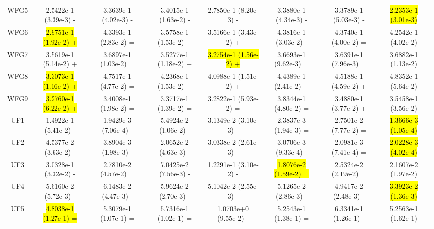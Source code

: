 \documentclass[journal]{IEEEtran}
\begin{document}
\begin{table}[tbp]
{\begin{tabular}{cccccccc}
            WFG5    & 2.5422e-1 (3.39e-3) -      & 3.3639e-1 (4.02e-3) -      & 3.4015e-1 (1.63e-2) -      & 2.7850e-1 (8.20e-3) -      & 3.3880e-1 (4.34e-3) -      & 3.3789e-1 (5.03e-3) -      & \hl{2.2353e-1 (3.01e-3)} \\
            WFG6    & \hl{2.9751e-1 (1.92e-2) +} & 4.3393e-1 (2.83e-2) =      & 3.5758e-1 (1.53e-2) +      & 3.5166e-1 (3.43e-2) +      & 4.3816e-1 (3.03e-2) -      & 4.3740e-1 (4.00e-2) =      & 4.2542e-1 (4.02e-2)      \\
            WFG7    & 3.5619e-1 (5.14e-2) +      & 3.6897e-1 (1.03e-2) =      & 3.5277e-1 (1.18e-2) +      & \hl{3.2754e-1 (1.56e-2) +} & 3.6693e-1 (9.62e-3) =      & 3.6391e-1 (7.96e-3) =      & 3.6882e-1 (1.13e-2)      \\
            WFG8    & \hl{3.3073e-1 (1.16e-2) +} & 4.7517e-1 (4.77e-2) =      & 4.2368e-1 (1.53e-2) +      & 4.0988e-1 (1.51e-2) +      & 4.4389e-1 (2.41e-2) +      & 4.5188e-1 (4.59e-2) +      & 4.8352e-1 (5.64e-2)      \\
            WFG9    & \hl{3.2760e-1 (6.22e-2) +} & 3.4008e-1 (1.98e-2) =      & 3.3717e-1 (1.39e-2) =      & 3.2822e-1 (5.93e-2) =      & 3.8344e-1 (4.80e-2) =      & 3.4880e-1 (3.77e-2) +      & 3.5458e-1 (3.56e-2)      \\
            \hline
            UF1     & 1.4922e-1 (5.41e-2) -      & 1.9429e-3 (7.06e-4) -      & 5.4924e-2 (1.06e-2) -      & 3.1349e-2 (3.10e-3) -      & 2.3837e-3 (1.94e-3) =      & 2.7501e-2 (7.77e-2) =      & \hl{1.3666e-3 (1.05e-4)} \\
            UF2     & 4.5377e-2 (3.63e-2) -      & 3.8904e-3 (1.98e-3) -      & 2.0652e-2 (4.63e-3) -      & 3.0338e-2 (2.61e-3) -      & 3.0706e-3 (9.33e-4) -      & 2.0981e-3 (7.41e-4) =      & \hl{2.0228e-3 (4.02e-4)} \\
            UF3     & 3.0328e-1 (3.32e-2) -      & 2.7810e-2 (4.57e-2) =      & 7.0425e-2 (7.56e-3) -      & 1.2291e-1 (3.10e-2) -      & \hl{1.8076e-2 (1.59e-2) =} & 2.5324e-2 (2.19e-2) =      & 2.1607e-2 (1.97e-2)      \\
            UF4     & 5.6160e-2 (5.72e-3) -      & 6.1483e-2 (4.47e-3) -      & 5.9624e-2 (2.70e-3) -      & 5.1042e-2 (2.55e-3) -      & 5.1265e-2 (2.86e-3) -      & 4.9417e-2 (2.48e-3) -      & \hl{3.3923e-2 (1.36e-3)} \\
            UF5     & \hl{4.8038e-1 (1.27e-1) =} & 5.3079e-1 (1.07e-1) =      & 5.7316e-1 (1.02e-1) =      & 1.0703e+0 (9.55e-2) -      & 5.2543e-1 (1.38e-1) =      & 6.3341e-1 (1.26e-1) -      & 5.2563e-1 (1.62e-1)      \\

\end{tabular}}
\end{table}
\end{document}

